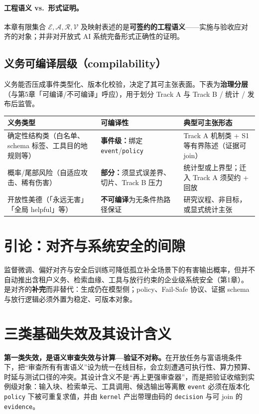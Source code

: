 \documentclass[11pt,a4paper]{report}
\begin{document}
\paragraph{工程语义 vs.\ 形式证明。}本章有限集合 \(\mathcal{E},\mathcal{A},\mathcal{R},\mathcal{V}\) 及映射表述的是\textbf{可签约的工程语义}——实施与验收应对齐的对象；并非对开放式 AI 系统完备形式正确性的证明。

\subsection{义务可编译层级（compilability）}
义务能否压成事件类型化、版本化校验，决定了其可主张表面。下表为\textbf{治理分层}（与第5章「可编译/不可编译」呼应），用于划分 Track A 与 Track B / 统计 / 发布后监管。

\begin{center}
\footnotesize
\begin{tabular}{@{}p{}p{}p{}@{}}
\toprule
\textbf{义务类型} & \textbf{可编译性} & \textbf{典型可主张形态} \\
\midrule
确定性结构类（白名单、schema 标签、工具目的地规则等） & \textbf{事件级：}绑定 \texttt{event}/\texttt{policy} & Track A 机制类 + S1 等有界陈述（证据可 join） \\
概率/尾部风险（自适应攻击、稀有伤害） & \textbf{部分：}须显式误差界、切片、Track B 压力 & 统计型或上界型；迁入 Track A 须契约 + 回放 \\
开放性美德（「永远无害」「全局 helpful」等） & \textbf{不可编译}为无条件热路径保证 & 研究议程、非目标，或显式统计主张 \\
\bottomrule
\end{tabular}
\end{center}

\section{引论：对齐与系统安全的间隙}
监督微调、偏好对齐与安全后训练可降低孤立补全场景下的有害输出概率，但并不自动推出含租户义务、检索血缘、工具与放行约束的企业级系统安全（第1章）。\DecoupledSafety{} 是对齐的\textbf{补完}而非替代：生成仍在模型侧；policy、Fail-Safe 协议、证据 schema 与放行逻辑必须外置为稳定、可版本对象。

\section{三类基础失效及其设计含义}
\textbf{第一类失效，是语义审查失效与计算—验证不对称。}在开放任务与富语境条件下，把“审查所有有害语义”设为统一在线目标，会立刻遭遇可执行性、算力预算、时延与测试口径的冲突。其设计含义不是“再上更强审查器”，而是把验证收缩到实例级对象：输入块、检索单元、工具调用、候选输出等离散 \texttt{event} 必须在版本化 \texttt{policy} 下被可重复求值，并由 \texttt{kernel} 产出带理由码的 \texttt{decision} 与可 join 的 \texttt{evidence}。
\end{document}
